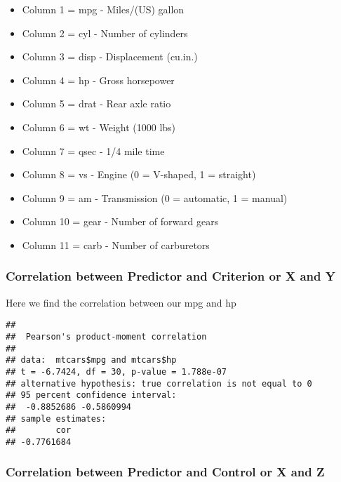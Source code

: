 \documentclass[
]{book}
\newenvironment{Shaded}{\begin{snugshade}}{\end{snugshade}}
\newcommand{\FunctionTok}[1]{\textcolor[rgb]{0.13,0.29,0.53}{\textbf{#1}}}
\newcommand{\NormalTok}[1]{#1}
\newcommand{\SpecialCharTok}[1]{\textcolor[rgb]{0.81,0.36,0.00}{\textbf{#1}}}
\providecommand{\tightlist}{%
  \setlength{\itemsep}{0pt}\setlength{\parskip}{0pt}}
\theoremstyle{definition}
\theoremstyle{definition}
\theoremstyle{definition}
\theoremstyle{definition}
\theoremstyle{remark}
\begin{document}
\begin{itemize}
\tightlist
\item
  Column 1 = mpg - Miles/(US) gallon
\item
  Column 2 = cyl - Number of cylinders
\item
  Column 3 = disp - Displacement (cu.in.)
\item
  Column 4 = hp - Gross horsepower
\item
  Column 5 = drat - Rear axle ratio
\item
  Column 6 = wt - Weight (1000 lbs)
\item
  Column 7 = qsec - 1/4 mile time
\item
  Column 8 = vs - Engine (0 = V-shaped, 1 = straight)
\item
  Column 9 = am - Transmission (0 = automatic, 1 = manual)
\item
  Column 10 = gear - Number of forward gears
\item
  Column 11 = carb - Number of carburetors
\end{itemize}

\hypertarget{correlation-between-predictor-and-criterion-or-x-and-y}{%
\subsubsection{Correlation between Predictor and Criterion or X and Y}\label{correlation-between-predictor-and-criterion-or-x-and-y}}

Here we find the correlation between our mpg and hp

\begin{Shaded}
\end{Shaded}

\begin{verbatim}
## 
##  Pearson's product-moment correlation
## 
## data:  mtcars$mpg and mtcars$hp
## t = -6.7424, df = 30, p-value = 1.788e-07
## alternative hypothesis: true correlation is not equal to 0
## 95 percent confidence interval:
##  -0.8852686 -0.5860994
## sample estimates:
##        cor 
## -0.7761684
\end{verbatim}

\hypertarget{correlation-between-predictor-and-control-or-x-and-z}{%
\subsubsection{Correlation between Predictor and Control or X and Z}\label{correlation-between-predictor-and-control-or-x-and-z}}
\end{document}
